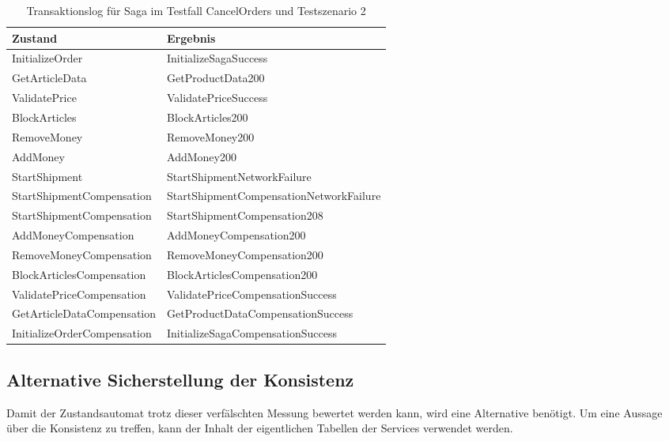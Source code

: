 \begin{center}
	\fontsize{9}{12}\selectfont
	\begin{longtable}[h]{|p{4.5cm}|p{6.5cm}|}
		\hline
		Zustand & Ergebnis \\* \hline
		\endhead
		\hline
		\caption{Transaktionslog für Saga im Testfall CancelOrders und Testszenario 2}
		\label{tab:transaktionslog_ts2_cancelorders_smbasic}
		\endfoot
		InitializeOrder & InitializeSagaSuccess \\* \hline
		GetArticleData & GetProductData200 \\* \hline
		ValidatePrice & ValidatePriceSuccess \\* \hline
		BlockArticles & BlockArticles200 \\* \hline
		RemoveMoney & RemoveMoney200 \\* \hline
		AddMoney & AddMoney200 \\* \hline
		\rowcolor{Gray}
		StartShipment & StartShipmentNetworkFailure \\* \hline
		StartShipmentCompensation & StartShipmentCompensationNetworkFailure \\* \hline
		\rowcolor{Gray}
		StartShipmentCompensation & StartShipmentCompensation208 \\* \hline
		AddMoneyCompensation & AddMoneyCompensation200 \\* \hline
		RemoveMoneyCompensation & RemoveMoneyCompensation200 \\* \hline
		BlockArticlesCompensation & BlockArticlesCompensation200 \\* \hline
		ValidatePriceCompensation & ValidatePriceCompensationSuccess \\* \hline
		GetArticleDataCompensation & GetProductDataCompensationSuccess \\* \hline
		InitializeOrderCompensation & InitializeSagaCompensationSuccess \\* \hline
	\end{longtable}
\end{center}
\FloatBarrier

\subsection{Alternative Sicherstellung der Konsistenz}
Damit der Zustandsautomat trotz dieser verfälschten Messung bewertet werden kann, wird eine Alternative benötigt. Um eine Aussage über die Konsistenz zu treffen, kann der Inhalt der eigentlichen Tabellen der Services verwendet werden. 

